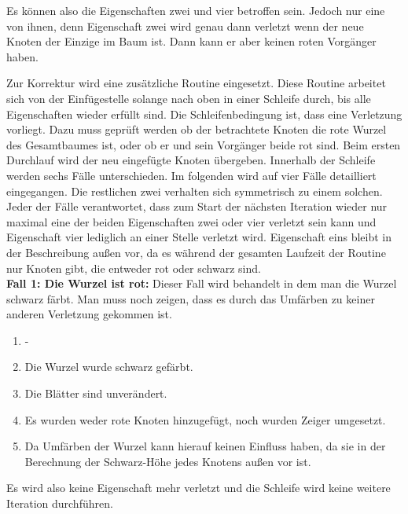 \documentclass[a4paper,12pt]{article}
\begin{document}
\noindent Es können also die Eigenschaften zwei und vier betroffen sein. Jedoch nur eine von ihnen, denn Eigenschaft zwei wird genau dann verletzt wenn der neue Knoten der Einzige im Baum ist. Dann kann er aber keinen roten Vorgänger haben.

 \noindent Zur Korrektur wird eine zusätzliche Routine eingesetzt. Diese Routine arbeitet sich von der Einfügestelle solange nach oben in einer Schleife durch, bis alle Eigenschaften wieder erfüllt sind. Die Schleifenbedingung ist, dass eine Verletzung vorliegt. Dazu muss geprüft werden ob der betrachtete Knoten die rote Wurzel des Gesamtbaumes ist, oder ob er und sein Vorgänger beide rot sind. Beim ersten Durchlauf wird der neu eingefügte Knoten übergeben. Innerhalb der Schleife werden sechs Fälle unterschieden. Im folgenden wird auf vier Fälle detailliert eingegangen. Die restlichen zwei verhalten sich symmetrisch zu einem solchen. Jeder der Fälle verantwortet, dass zum Start der nächsten Iteration wieder nur maximal eine der beiden Eigenschaften zwei oder vier verletzt sein kann und Eigenschaft vier lediglich an einer Stelle verletzt wird.  Eigenschaft eins bleibt in der Beschreibung außen vor, da es während der gesamten Laufzeit der Routine nur Knoten gibt, die entweder rot oder schwarz sind. \\
 
\noindent\textbf{Fall 1: Die Wurzel ist rot: }
Dieser Fall wird behandelt in dem man die Wurzel schwarz färbt. Man muss noch zeigen, dass es durch das Umfärben zu keiner anderen Verletzung gekommen ist. 
\begin{enumerate}
	\item -
	\item Die Wurzel wurde schwarz gefärbt.
	\item Die Blätter sind unverändert.
	\item Es wurden weder rote Knoten hinzugefügt, noch wurden Zeiger umgesetzt. 
	\item Da Umfärben der Wurzel kann hierauf keinen Einfluss haben, da sie in der Berechnung der Schwarz-Höhe jedes  Knotens außen vor ist.
\end{enumerate}  

\noindent Es wird also keine Eigenschaft mehr verletzt und die Schleife wird keine weitere Iteration durchführen.
\end{document}
